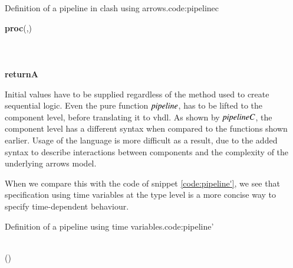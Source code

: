 \begin{texexptitled}{Definition of a pipeline in \gls{clash} using arrows.}{code:pipelinec}\begin{hscode}\SaveRestoreHook
{}%
%
%
%
%
%
\>[3]{}\mathrel{=}\textbf{proc}\;(,)\to {}\<[E]%
\\
\>[3]{}\<[5]%
\>[5]{}\leftarrow{}\<[22]%
\>[22]{}\<[30]%
\>[30]{}\prec{}\mathbin{+}\<[E]%
\\
\>[3]{}\<[5]%
\>[5]{}\leftarrow{}\<[22]%
\>[22]{}\<[30]%
\>[30]{}\prec{}\<[E]%
\\
\>[3]{}\<[5]%
\>[5]{}\leftarrow{}\<[22]%
\>[22]{}\<[30]%
\>[30]{}\prec{}\mathbin{+}\<[E]%
\\
\>[3]{}\<[5]%
\>[5]{}\textbf{returnA}\prec{}\<[E]%
\ColumnHook
\end{hscode}\resethooks
\end{texexptitled}

Initial values have to be supplied regardless of the method used to create sequential logic.
Even the pure function \ensuremath{\Varid{pipeline}}, has to be lifted to the component level, before translating it to \gls{vhdl}.
As shown by \ensuremath{\Varid{pipelineC}}, the component level has a different syntax when compared to the functions shown earlier.
Usage of the language is more difficult as a result, due to the added syntax to describe interactions between components and the complexity of the underlying arrows model.

When we compare this with the code of snippet \ref{code:pipeline'}, we see that specification using time variables at the type level is a more concise way to specify time-dependent behaviour.

\begin{texexptitled}{Definition of a pipeline using time variables.}{code:pipeline'}\begin{hscode}\SaveRestoreHook
{}%
%
%
\>[3]{}\mathbin{::}\langle{}\rangle\to {}\langle{}\rangle\to {}\langle{}\mathbin{+}\rangle{}\<[E]%
\\
\>[3]{}\;\;\mathrel{=}(\mathbin{*})\mathbin{+}\<[E]%
\ColumnHook
\end{hscode}\resethooks
\end{texexptitled}

